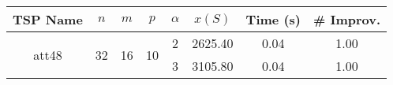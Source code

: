 \begin{tabular}{|ccccc|ccc|}
\toprule
      TSP Name & $n$ & $m$ & $p$ & $\alpha$   & $x(S)$ &  Time (s) &  \# Improv. \\
\midrule
\multirow{2}{*}{att48} & \multirow{2}{*}{32} & \multirow{2}{*}{16} & \multirow{2}{*}{10} & 2 & 2625.40 &  0.04 &     1.00 \\
      &    &    &    & 3 & 3105.80 &  0.04 &     1.00 \\
\bottomrule
\end{tabular}
